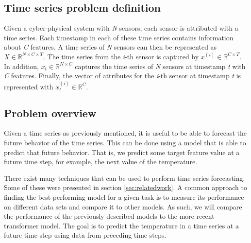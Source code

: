 \subsection{Time series problem definition}
Given a cyber-physical system with \textit{N} sensors, each sensor is attributed with a time series.
Each timestamp in each of these time series contains information about \textit{C} features.
A time series of \textit{N} sensors can then be represented as \(X \in \mathbb{R}^{N \times C \times T}\).
The time series from the \textit{i}-th sensor is captured by \(x^{(i)} \in \mathbb{R}^{C \times T} \).
In addition, \(x_{t} \in \mathbb{R}^{N \times C}\) captures the time series of \textit{N} sensors at timestamp \textit{t} with \textit{C} features.
Finally, the vector of attributes for the \textit{i}-th sensor at timestamp \textit{t} is represented with \(x_{t}^{(i)} \in \mathbb{R}^{C}\). \cite{cirsteaEnhanceNetPluginNeural2021}


\subsection{Problem overview}
Given a time series as previously mentioned, it is useful to be able to forecast the future behavior of the time series.
This can be done using a model that is able to predict that future behavior.
That is, we predict some target feature value at a future time step, for example, the next value of the temperature.


There exist many techniques that can be used to perform time series forecasting. Some of these were presented in section \ref{sec:relatedwork}.
A common approach to finding the best-performing model for a given task is to measure its performance on different data sets and compare it to other models.
As such, we will compare the performance of the previously described models to the more recent transformer model.
The goal is to predict the temperature in a time series at a future time step using data from preceding time steps.